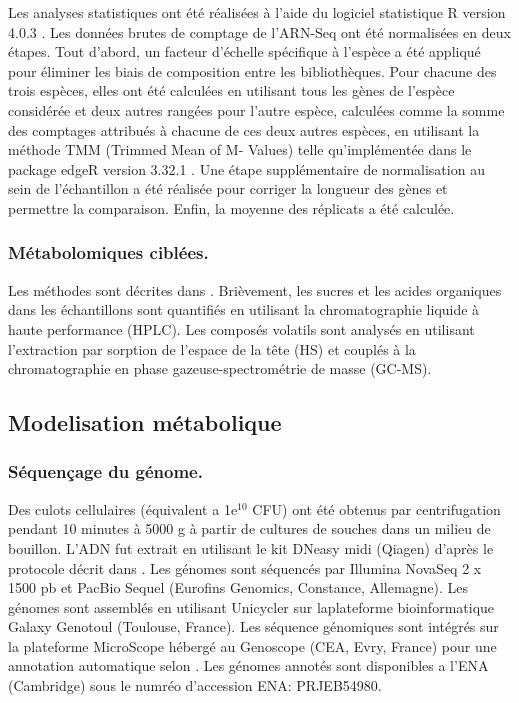\documentclass[../main.tex]{subfiles}
\begin{document}
Les analyses statistiques ont été réalisées à l'aide du logiciel statistique R version 4.0.3 \citep{R2021}. Les données brutes de comptage de l'ARN-Seq ont été normalisées en deux étapes. Tout d'abord, un facteur d'échelle spécifique à l'espèce a été appliqué pour éliminer les biais de composition entre les bibliothèques. Pour chacune des trois espèces, elles ont été calculées en utilisant tous les gènes de l'espèce considérée et deux autres rangées pour l'autre espèce, calculées comme la somme des comptages attribués à chacune de ces deux autres espèces, en utilisant la méthode TMM (Trimmed Mean of M- Values) telle qu'implémentée dans le package edgeR version 3.32.1 \citep{Robinson2010}. Une étape supplémentaire de normalisation au sein de l'échantillon a été réalisée pour corriger la longueur des gènes et permettre la comparaison. Enfin, la moyenne des réplicats a été calculée.


\subsubsection{Métabolomiques ciblées.}  Les méthodes sont décrites dans \citep{Cao2021}. Brièvement, les sucres et les acides organiques dans les échantillons sont quantifiés en utilisant la chromatographie liquide à haute performance (HPLC). Les composés volatils sont analysés en utilisant l'extraction par sorption de l'espace de la tête (HS) et couplés à la chromatographie en phase gazeuse-spectrométrie de masse (GC-MS).

\subsection{Modelisation métabolique}

\subsubsection{Séquençage du génome.} Des culots cellulaires (équivalent a 1e$^{10}$ CFU) ont été obtenus par centrifugation pendant 10 minutes à 5000 g à partir de cultures de souches dans un milieu de bouillon. L'ADN fut extrait en utilisant le kit DNeasy midi (Qiagen) d'après le protocole décrit dans \citep{Falentin.2010}. Les génomes sont séquencés par Illumina NovaSeq 2 x 1500 pb et PacBio Sequel (Eurofins Genomics, Constance, Allemagne). Les génomes sont assemblés en utilisant Unicycler \citep{Wick2017a,Wick2017b} sur laplateforme bioinformatique Galaxy Genotoul (Toulouse, France). Les séquence génomiques sont intégrés sur la plateforme MicroScope hébergé au Genoscope (CEA, Evry, France) pour une annotation automatique selon \citep{Vallenet.2019}. Les génomes annotés sont disponibles a l'ENA (Cambridge) sous le numréo d'accession ENA: PRJEB54980.
\end{document}
